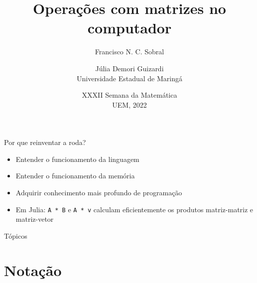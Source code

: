 \documentclass[]{beamer}
\author[Sobral, Guizardi]{Francisco N. C. Sobral \and Júlia Demori Guizardi\\ Universidade Estadual de Maringá}
\date[XXXII SEMAT]{XXXII Semana da Matemática\\UEM, 2022}
\title[Mat. Mult.]{Operações com matrizes no computador}
\newcommand{\code}[1]{\colorbox[gray]{0.8}{\texttt{#1}}}
\begin{document}
\begin{frame}[plain]
\titlepage
\end{frame}

\begin{frame}{Por que reinventar a roda?}

  \begin{itemize}
  \item Entender o funcionamento da linguagem

  \item Entender o funcionamento da memória

  \item Adquirir conhecimento mais profundo de programação

  \item Em Julia: \code{A * B} e \code{A * v} calculam
    eficientemente os produtos matriz-matriz e matriz-vetor
  \end{itemize}

\end{frame}

\begin{frame}{Tópicos}
\tableofcontents
\end{frame}

\section{Notação}
\end{document}
